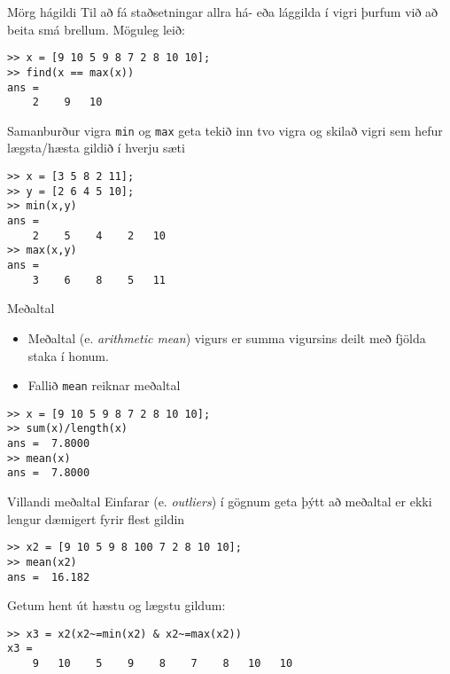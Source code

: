 \documentclass{beamer}
\begin{document}
\begin{frame}[fragile]{Mörg hágildi}
Til að fá staðsetningar allra há- eða lággilda í vigri þurfum við að beita smá brellum. \pause
Möguleg leið:
\begin{verbatim}
>> x = [9 10 5 9 8 7 2 8 10 10];
>> find(x == max(x))
ans =
    2    9   10
\end{verbatim}
\end{frame}

\begin{frame}[fragile]{Samanburður vigra}
\vspace{\baselineskip}
\texttt{min} og \texttt{max} geta tekið inn tvo vigra og skilað vigri sem hefur lægsta/hæsta gildið í hverju sæti
\begin{verbatim}
>> x = [3 5 8 2 11];
>> y = [2 6 4 5 10];
>> min(x,y)
ans =
    2    5    4    2   10
>> max(x,y)
ans =
    3    6    8    5   11
\end{verbatim}
\end{frame}

\begin{frame}[fragile]{Meðaltal}
\begin{itemize}
 \item Meðaltal (e. \emph{arithmetic mean}) vigurs er summa vigursins deilt með fjölda staka í honum.
 \item Fallið \texttt{mean} reiknar meðaltal
\end{itemize}
\begin{verbatim}
>> x = [9 10 5 9 8 7 2 8 10 10];
>> sum(x)/length(x)
ans =  7.8000
>> mean(x)
ans =  7.8000
\end{verbatim}
\end{frame}

\begin{frame}[fragile]{Villandi meðaltal}
\vspace{\baselineskip}
Einfarar (e. \emph{outliers}) í gögnum geta þýtt að meðaltal er ekki lengur dæmigert fyrir flest gildin
\begin{verbatim}
>> x2 = [9 10 5 9 8 100 7 2 8 10 10];
>> mean(x2)
ans =  16.182
\end{verbatim}
Getum hent út hæstu og lægstu gildum:
\begin{verbatim}
>> x3 = x2(x2~=min(x2) & x2~=max(x2))
x3 =
    9   10    5    9    8    7    8   10   10
\end{verbatim}
\end{frame}
\end{document}
